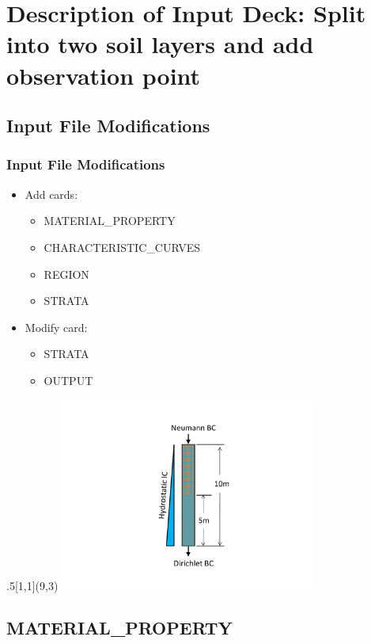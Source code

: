 \documentclass{beamer}
\begin{document}
\section{Description of Input Deck: Split into two soil layers and add observation point}

\subsection{Input File Modifications}

\begin{frame}[fragile]\frametitle{Input File Modifications}

\begin{itemize}
\item Add cards:
  \begin{itemize}
    \item MATERIAL\_PROPERTY
    \item CHARACTERISTIC\_CURVES
    \item REGION
    \item STRATA
  \end{itemize}
\item Modify card:
  \begin{itemize}
    \item STRATA
    \item OUTPUT
   \end{itemize}
\end{itemize}
\begin{textblock}{.5}[1,1](9,3)
\includegraphics[height=2.5in]{./vsat_flow_layered}
\end{textblock} 
\end{frame}


\subsection{MATERIAL\_PROPERTY}
\end{document}
